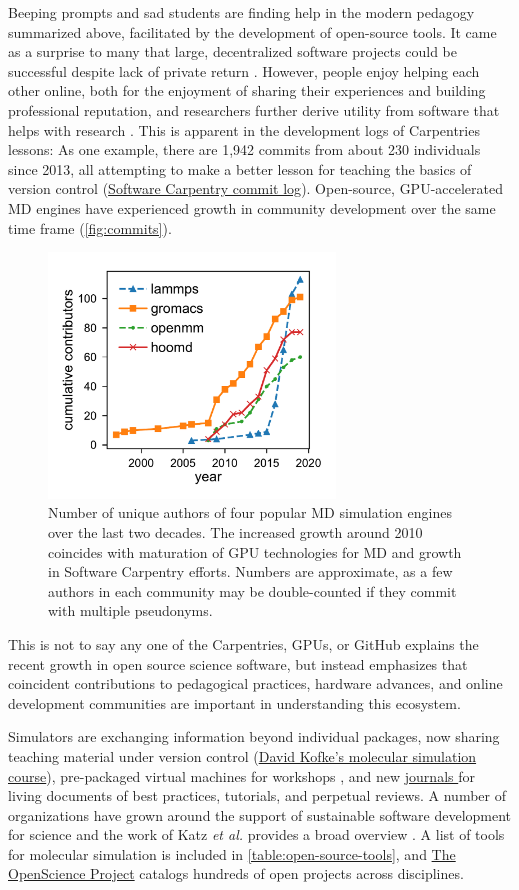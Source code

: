 Beeping prompts and sad students are finding help in the modern pedagogy summarized above, facilitated by the development of open-source tools.
It came as a surprise to many that large, decentralized software projects could be successful despite lack of private return \cite{Hippel2003}.
However, people enjoy helping each other online, both for the enjoyment of sharing their experiences and building professional reputation, and researchers further derive utility from software that helps with research \cite{Sarthou2005}.
This is apparent in the development logs of Carpentries lessons:
As one example, there are 1,942 commits from about 230 individuals since 2013, all attempting to make a better lesson for teaching the basics of version control (\href{https://github.com/swcarpentry/git-novice/commits/gh-pages}{Software Carpentry commit log}).
Open-source, GPU-accelerated MD engines have experienced growth in community development over the same time frame (\autoref{fig:commits}).
\begin{figure}
    \centering
    \includegraphics[width=3in]{figures/pub4/commits.pdf}
    \caption{Number of unique authors of four popular MD simulation engines over the last two decades. The increased growth around 2010 coincides with maturation of GPU technologies for MD and growth in Software Carpentry efforts. Numbers are approximate, as a few authors in each community may be double-counted if they commit with multiple pseudonyms.}\label{fig:commits}
\end{figure}
This is not to say any one of the Carpentries, GPUs, or GitHub explains the recent growth in open source science software, but instead emphasizes that coincident contributions to pedagogical practices, hardware advances, and online development communities are important in understanding this ecosystem.

Simulators are exchanging information beyond individual packages, now sharing teaching material under version control (\href{https://github.com/kofkeLab/Mol-Sim-Intro}{David Kofke's molecular simulation course}), pre-packaged virtual machines for workshops \cite{Jankowski2018b}, and new \href{https://www.livecomsjournal.org/}{journals } for living documents of best practices, tutorials, and perpetual reviews. %
A number of organizations have grown around the support of sustainable software development for science and the work of Katz \textit{et al.} provides a broad overview \cite{Katz2019}.
A list of tools for molecular simulation is included in \autoref{table:open-source-tools}, and \href{http://openscience.org/}{The OpenScience Project} catalogs hundreds of open projects across disciplines.

